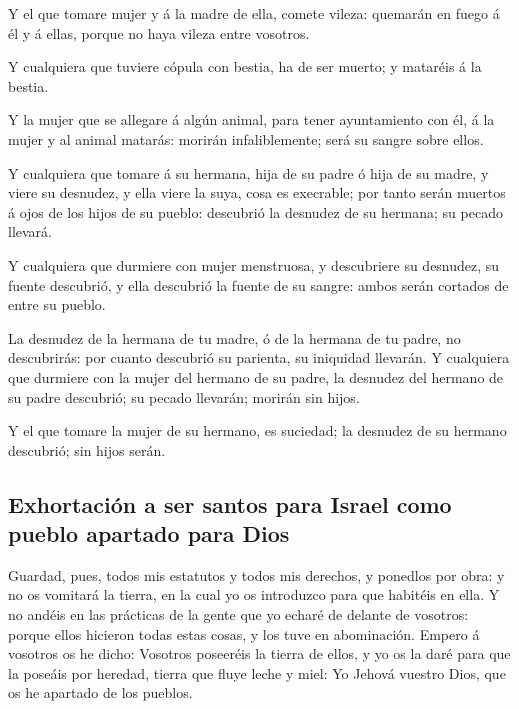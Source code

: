  Y el que tomare mujer y á la madre de ella, comete vileza:
quemarán en fuego á él y á ellas, porque no haya vileza entre vosotros.

 Y cualquiera que tuviere cópula con bestia, ha de ser
muerto; y mataréis á la bestia.

 Y la mujer que se allegare á algún animal, para tener
ayuntamiento con él, á la mujer y al animal matarás: morirán
infaliblemente; será su sangre sobre ellos.

 Y cualquiera que tomare á su hermana, hija de su padre ó
hija de su madre, y viere su desnudez, y ella viere la suya, cosa es
execrable; por tanto serán muertos á ojos de los hijos de su pueblo:
descubrió la desnudez de su hermana; su pecado llevará.

 Y cualquiera que durmiere con mujer menstruosa, y
descubriere su desnudez, su fuente descubrió, y ella descubrió la fuente
de su sangre: ambos serán cortados de entre su pueblo.

 La desnudez de la hermana de tu madre, ó de la hermana de
tu padre, no descubrirás: por cuanto descubrió su parienta, su iniquidad
llevarán.  Y cualquiera que durmiere con la mujer del
hermano de su padre, la desnudez del hermano de su padre descubrió; su
pecado llevarán; morirán sin hijos.

 Y el que tomare la mujer de su hermano, es suciedad; la
desnudez de su hermano descubrió; sin hijos serán.

\hypertarget{exhortaciuxf3n-a-ser-santos-para-israel-como-pueblo-apartado-para-dios}{%
\subsection{Exhortación a ser santos para Israel como pueblo apartado
para
Dios}\label{exhortaciuxf3n-a-ser-santos-para-israel-como-pueblo-apartado-para-dios}}

 Guardad, pues, todos mis estatutos y todos mis derechos, y
ponedlos por obra: y no os vomitará la tierra, en la cual yo os
introduzco para que habitéis en ella.  Y no andéis en las
prácticas de la gente que yo echaré de delante de vosotros: porque ellos
hicieron todas estas cosas, y los tuve en abominación. 
Empero á vosotros os he dicho: Vosotros poseeréis la tierra de ellos, y
yo os la daré para que la poseáis por heredad, tierra que fluye leche y
miel: Yo Jehová vuestro Dios, que os he apartado de los pueblos.

